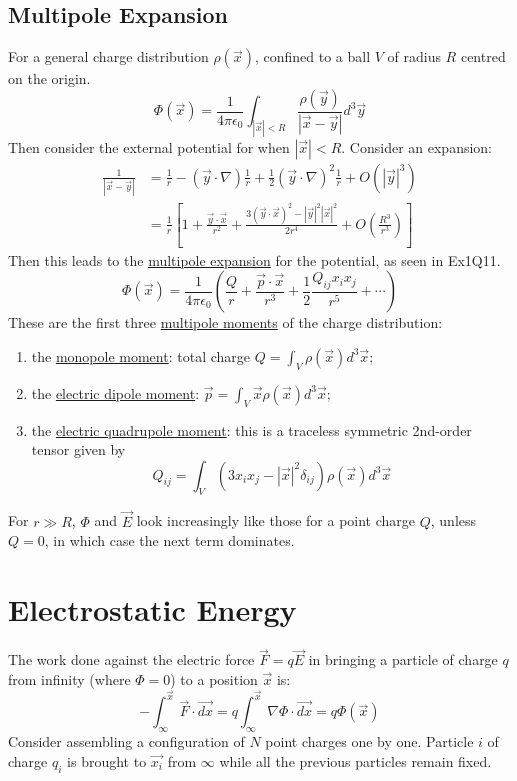 \documentclass[../Main.tex]{subfiles}
\begin{document}
\subsection{Multipole Expansion}
For a general charge distribution $\rho(\vec{x})$, confined to a ball $V$ of radius $R$ centred on the origin.
\begin{equation*}
    \Phi(\vec{x}) = \frac{1}{4\pi \epsilon_0} \int_{|\vec{x}| < R} \frac{\rho(\vec{y})}{|\vec{x} - \vec{y}|} d^3 \vec{y}
\end{equation*}
Then consider the external potential for when $|\vec{x}| < R$. Consider an expansion:
\begin{align*}
    \frac{1}{|\vec{x} - \vec{y}|} &= \frac1r - (\vec{y} \cdot \nabla)\frac1r + \frac12 (\vec{y} \cdot \nabla)^2 \frac1r + O(|\vec{y}|^3) \\
    &= \frac1r \left[1 + \frac{\vec{y} \cdot \vec{x}}{r^2} + \frac{3(\vec{y} \cdot \vec{x})^2 - |\vec{y}|^2 |\vec{x}|^2}{2r^4} + O\left(\frac{R^3}{r^3}\right)\right]
\end{align*} 
Then this leads to the \underline{multipole expansion} for the potential, as seen in Ex1Q11.
\begin{equation*}
    \Phi(\vec{x}) = \frac{1}{4\pi \epsilon_0} \left(\frac{Q}{r} + \frac{\vec{p} \cdot \vec{x}}{r^3} + \frac12 \frac{Q_{ij} x_i x_j}{r^5} + \cdots\right)
\end{equation*}
These are the first three \underline{multipole moments} of the charge distribution:
\begin{enumerate}
    \item the \underline{monopole moment}: total charge $Q = \int_V \rho(\vec{x}) d^3 \vec{x}$;
    \item the \underline{electric dipole moment}: $\vec{p} = \int_V \vec{x} \rho(\vec{x}) d^3 \vec{x}$;
    \item the \underline{electric quadrupole moment}: this is a traceless symmetric 2nd-order tensor given by
        \begin{equation*}
            Q_{ij} = \int_V \left(3 x_i x_j - |\vec{x}|^2 \delta_{ij}\right) \rho(\vec{x}) d^3 \vec{x}
        \end{equation*}
\end{enumerate}
For $r \gg R$, $\Phi$ and $\vec{E}$ look increasingly like those for a point charge $Q$, unless $Q = 0$, in which case the next term dominates.
\section{Electrostatic Energy}
The work done against the electric force $\vec{F} = q\vec{E}$ in bringing a particle of charge $q$ from infinity (where $\Phi = 0$) to a position $\vec{x}$ is:
\begin{equation}
    - \int_{\infty}^{\vec{x}} \vec{F} \cdot \vec{dx} = q \int_\infty^{\vec{x}} \nabla \Phi \cdot \vec{dx} = q \Phi(\vec{x})
    \label{eqnElectroWork}
\end{equation}
Consider assembling a configuration of $N$ point charges one by one. Particle $i$ of charge $q_i$ is brought to $\vec{x_i}$ from $\infty$ while all the previous particles remain fixed.
\end{document}
